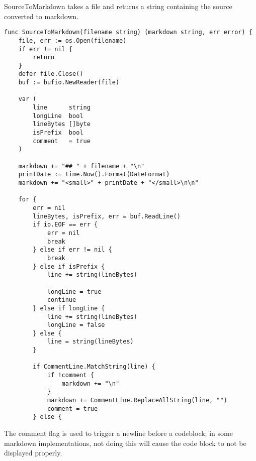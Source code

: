 \documentclass[11pt]{article}
\begin{document}
SourceToMarkdown takes a file and returns a string containing the
source converted to markdown.


\begin{verbatim}
func SourceToMarkdown(filename string) (markdown string, err error) {
	file, err := os.Open(filename)
	if err != nil {
		return
	}
	defer file.Close()
	buf := bufio.NewReader(file)

	var (
		line      string
		longLine  bool
		lineBytes []byte
		isPrefix  bool
		comment   = true
	)

	markdown += "## " + filename + "\n"
	printDate := time.Now().Format(DateFormat)
	markdown += "<small>" + printDate + "</small>\n\n"

	for {
		err = nil
		lineBytes, isPrefix, err = buf.ReadLine()
		if io.EOF == err {
			err = nil
			break
		} else if err != nil {
			break
		} else if isPrefix {
			line += string(lineBytes)

			longLine = true
			continue
		} else if longLine {
			line += string(lineBytes)
			longLine = false
		} else {
			line = string(lineBytes)
		}

		if CommentLine.MatchString(line) {
			if !comment {
				markdown += "\n"
			}
			markdown += CommentLine.ReplaceAllString(line, "")
			comment = true
		} else {
\end{verbatim}

The comment flag is used to trigger a newline
before a codeblock; in some markdown
implementations, not doing this will cause the code
block to not be displayed properly.
\end{document}
